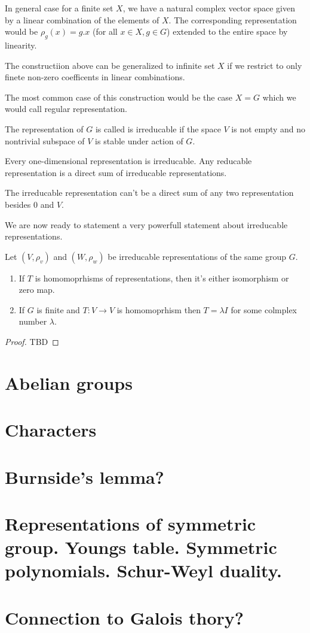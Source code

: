 \documentclass{amsart}
\begin{document}
In general case for a finite set $X$, we have a natural complex vector space given by a linear combination of the elements of $X$.
The corresponding representation would be $\rho_g (x) = g . x$ (for all $x\in X, g \in G$)  extended to the entire space by linearity.

\begin{note}
    The constructiion above can be generalized to infinite set $X$ if we restrict to only finete non-zero coefficents in linear combinations.
\end{note}

The most common case of this construction would be the case $X = G$ which  we would call regular representation.

\begin{definition}

The representation of $G$ is called is irreducable if the space $V$ is not empty and no nontrivial subspace of $V$ is stable under action of $G$.
    
\end{definition}

\begin{lemma}
    Every one-dimensional representation is irreducable. Any reducable representation is a direct sum of irreducable representations.
\end{lemma}


The irreducable representation can't be a direct sum of any two representation besides $0$ and $V$.

We are now ready to statement a very powerfull statement about irreducable representations.

\begin{lemma}
    Let $(V, \rho_v)$ and $(W, \rho_w)$ be irreducable representations of the same group $G$.
    \begin{enumerate}
        \item If $T$ is homomoprhisms of representations, then it's either isomorphism or zero map.
        \item If $G$ is finite and $T : V \to V$ is homomoprhism then $T = \lambda I$ for some colmplex number $\lambda$.
    \end{enumerate}
\end{lemma}
\begin{proof}
    TBD
\end{proof}

\section{Abelian groups}

\section{Characters}

\section{Burnside's lemma?}

\section{Representations of symmetric group. Youngs table. Symmetric polynomials. Schur-Weyl duality. }

\section{Connection to Galois thory?}
\end{document}
